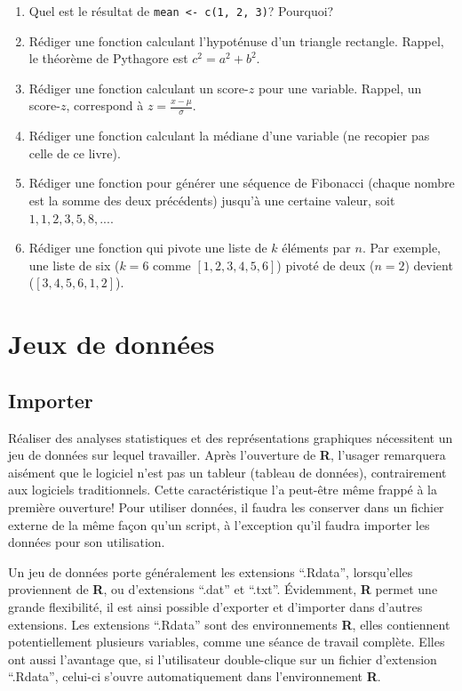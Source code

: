 \documentclass[
]{book}
\providecommand{\tightlist}{%
  \setlength{\itemsep}{0pt}\setlength{\parskip}{0pt}}
\begin{document}
\begin{enumerate}
\def\labelenumi{\arabic{enumi}.}
\tightlist
\item
  Quel est le résultat de \texttt{mean\ \textless{}-\ c(1,\ 2,\ 3)}? Pourquoi?
\item
  Rédiger une fonction calculant l'hypoténuse d'un triangle rectangle. Rappel, le théorème de Pythagore est \(c^2=a^2+b^2\).
\item
  Rédiger une fonction calculant un score-\(z\) pour une variable. Rappel, un score-\(z\), correspond à \(z=\frac{x-\mu}{\sigma}\).
\item
  Rédiger une fonction calculant la médiane d'une variable (ne recopier pas celle de ce livre).
\item
  Rédiger une fonction pour générer une séquence de Fibonacci (chaque nombre est la somme des deux précédents) jusqu'à une certaine valeur, soit \(1,1,2,3,5,8,...\).
\item
  Rédiger une fonction qui pivote une liste de \(k\) éléments par \(n\). Par exemple, une liste de six (\(k=6\) comme \([1,2,3,4,5,6]\)) pivoté de deux (\(n=2\)) devient (\([3,4,5,6,1,2]\)).
\end{enumerate}

\hypertarget{part-jeux-de-donnuxe9es}{%
\part{Jeux de données}\label{part-jeux-de-donnuxe9es}}

\hypertarget{importer}{%
\chapter{Importer}\label{importer}}

Réaliser des analyses statistiques et des représentations graphiques nécessitent un jeu de données sur lequel travailler. Après l'ouverture de \textbf{R}, l'usager remarquera aisément que le logiciel n'est pas un tableur (tableau de données), contrairement aux logiciels traditionnels. Cette caractéristique l'a peut-être même frappé à la première ouverture! Pour utiliser données, il faudra les conserver dans un fichier externe de la même façon qu'un script, à l'exception qu'il faudra importer les données pour son utilisation.

Un jeu de données porte généralement les extensions ``.Rdata'', lorsqu'elles proviennent de \textbf{R}, ou d'extensions ``.dat'' et ``.txt''. Évidemment, \textbf{R} permet une grande flexibilité, il est ainsi possible d'exporter et d'importer dans d'autres extensions. Les extensions ``.Rdata'' sont des environnements \textbf{R}, elles contiennent potentiellement plusieurs variables, comme une séance de travail complète. Elles ont aussi l'avantage que, si l'utilisateur double-clique sur un fichier d'extension ``.Rdata'', celui-ci s'ouvre automatiquement dans l'environnement \textbf{R}.
\end{document}
